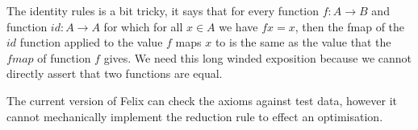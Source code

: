 \documentclass[oneside]{book}
\begin{document}
The identity rules is a bit tricky, it says that for every
function $f: A \rightarrow B$ and function $id: A\rightarrow A$
for which for all $x \in A$ we have $f x = x$, then the fmap
of the $id$ function applied to the value $f$ maps $x$ to
is the same as the value that the $fmap$ of function $f$ gives.
We need this long winded exposition because we cannot directly
assert that two functions are equal.

The current version of Felix can check the axioms against test data,
however it cannot mechanically implement the reduction rule to
effect an optimisation.
\end{document}
